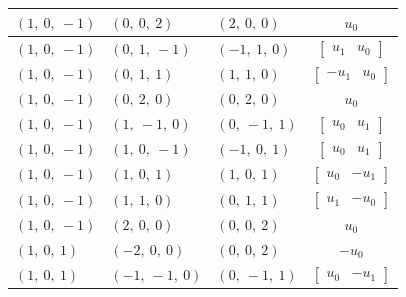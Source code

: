 \documentclass[11pt]{article}
\theoremstyle{definition}
\begin{document}
\begin{longtable}{|l|l|l|c|}
    \hline
    $\left( 1, \  0, \  -1\right)$ & $\left( 0, \  0, \  2\right)$ & $\left( 2, \  0, \  0\right)$ & $u_{0}$ \\
    \hline
    $\left( 1, \  0, \  -1\right)$ & $\left( 0, \  1, \  -1\right)$ & $\left( -1, \  1, \  0\right)$ & $\left[\begin{matrix}u_{1} & u_{0}\end{matrix}\right]$ \\
    \hline
    $\left( 1, \  0, \  -1\right)$ & $\left( 0, \  1, \  1\right)$ & $\left( 1, \  1, \  0\right)$ & $\left[\begin{matrix}- u_{1} & u_{0}\end{matrix}\right]$ \\
    \hline
    $\left( 1, \  0, \  -1\right)$ & $\left( 0, \  2, \  0\right)$ & $\left( 0, \  2, \  0\right)$ & $u_{0}$ \\
    \hline
    $\left( 1, \  0, \  -1\right)$ & $\left( 1, \  -1, \  0\right)$ & $\left( 0, \  -1, \  1\right)$ & $\left[\begin{matrix}u_{0} & u_{1}\end{matrix}\right]$ \\
    \hline
    $\left( 1, \  0, \  -1\right)$ & $\left( 1, \  0, \  -1\right)$ & $\left( -1, \  0, \  1\right)$ & $\left[\begin{matrix}u_{0} & u_{1}\end{matrix}\right]$ \\
    \hline
    $\left( 1, \  0, \  -1\right)$ & $\left( 1, \  0, \  1\right)$ & $\left( 1, \  0, \  1\right)$ & $\left[\begin{matrix}u_{0} & - u_{1}\end{matrix}\right]$ \\
    \hline
    $\left( 1, \  0, \  -1\right)$ & $\left( 1, \  1, \  0\right)$ & $\left( 0, \  1, \  1\right)$ & $\left[\begin{matrix}u_{1} & - u_{0}\end{matrix}\right]$ \\
    \hline
    $\left( 1, \  0, \  -1\right)$ & $\left( 2, \  0, \  0\right)$ & $\left( 0, \  0, \  2\right)$ & $u_{0}$ \\
    \hline
    $\left( 1, \  0, \  1\right)$ & $\left( -2, \  0, \  0\right)$ & $\left( 0, \  0, \  2\right)$ & $- u_{0}$ \\
    \hline
    $\left( 1, \  0, \  1\right)$ & $\left( -1, \  -1, \  0\right)$ & $\left( 0, \  -1, \  1\right)$ & $\left[\begin{matrix}u_{0} & - u_{1}\end{matrix}\right]$ \\

\end{longtable}
\end{document}
